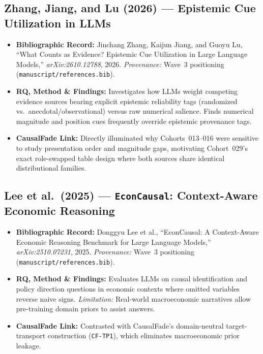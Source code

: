 \subsection{Zhang, Jiang, and Lu (2026) --- Epistemic Cue Utilization in LLMs \citep{zhang2026epistemic}}
\begin{itemize}
  \item \textbf{Bibliographic Record:} Jinchang Zhang, Kaijun Jiang, and Guoyu Lu, ``What Counts as Evidence? Epistemic Cue Utilization in Large Language Models,'' \emph{arXiv:2610.12788}, 2026. \emph{Provenance:} Wave~3 positioning (\texttt{manuscript/references.bib}).
  \item \textbf{RQ, Method \& Findings:} Investigates how LLMs weight competing evidence sources bearing explicit epistemic reliability tags (randomized vs.\ anecdotal/observational) versus raw numerical salience. Finds numerical magnitude and position cues frequently override epistemic provenance tags.
  \item \textbf{CausalFade Link:} Directly illuminated why Cohorts~013--016 were sensitive to study presentation order and magnitude gaps, motivating Cohort~029's exact role-swapped table design where both sources share identical distributional families.
\end{itemize}

\subsection{Lee et al.\ (2025) --- \texttt{EconCausal}: Context-Aware Economic Reasoning \citep{lee2025econcausal}}
\begin{itemize}
  \item \textbf{Bibliographic Record:} Donggyu Lee et al., ``EconCausal: A Context-Aware Economic Reasoning Benchmark for Large Language Models,'' \emph{arXiv:2510.07231}, 2025. \emph{Provenance:} Wave~3 positioning (\texttt{manuscript/references.bib}).
  \item \textbf{RQ, Method \& Findings:} Evaluates LLMs on causal identification and policy direction questions in economic contexts where omitted variables reverse naive signs. \emph{Limitation:} Real-world macroeconomic narratives allow pre-training domain priors to assist answers.
  \item \textbf{CausalFade Link:} Contrasted with CausalFade's domain-neutral target-transport construction (\texttt{CF-TP1}), which eliminates macroeconomic prior leakage.
\end{itemize}

